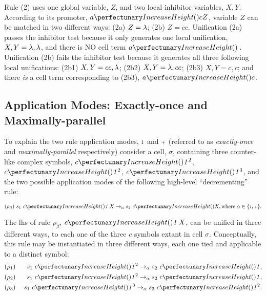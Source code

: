 Rule (2) uses one global variable, \(Z\), and two local inhibitor variables, \(X, Y\).
According to its promoter, \(\cpfunc{a}{cZ}\), variable \(Z\) can be matched in two different ways: 
(2a) \(Z = \lambda\); (2b) \(Z = cc\).
Unification (2a) passes the inhibitor test because it only generates one local unification,
\(X, Y = \lambda, \lambda\), and there is NO cell term \(\cpfunc{a}{\,}\).
Unification (2b) fails the inhibitor test because it generates all three following local unifications:
(2b1) \(X, Y = cc, \lambda\); (2b2) \(X, Y = \lambda, cc\); (2b3) \(X, Y = c, c\); 
and there \emph{is} a cell term corresponding to (2b3), \(\cpfunc{a}{c}\).

\subsection{\label{sec:cps:applicationmodes}Application Modes: Exactly-once and Maximally-parallel}
To explain the two rule application modes, \({\scriptstyle 1}\) and \({\scriptstyle +}\) (referred to as \emph{exactly-once} and \emph{maximally-parallel} respectively) consider a cell, \(\sigma\), containing three counter-like complex symbols,
\(\cpfunc{c}{\cpundig^2}\), \(\cpfunc{c}{\cpundig^2}\), \(\cpfunc{c}{\cpundig^3}\),
and the two possible application modes of the following high-level ``decrementing'' rule:
\vspace{-0.2cm}
\begin{framed}
\vspace{-0.5cm}
\[(\rho_\beta) ~s_1 ~\cpfunc{c}{\cpundig \, X} \rightarrow_{\alpha} s_2 ~\cpfunc{c}{X},\\
\mathrm{where} \; \alpha \in \{\cponce, \cpmaxpar\}.\]
\vspace{-0.8cm}
\end{framed}

The \gls{lhs} of rule \(\rho_\beta\), \(\cpfunc{c}{\cpundig \, X}\), can be unified in three different ways,
to each one of the three \(c\) symbols extant in cell \(\sigma\).
Conceptually, this rule may be instantiated in three different ways,
each one tied and applicable to a distinct symbol:
\begin{eqnarray*}
& (\rho_1)  & ~s_1 ~\cpfunc{c}{\cpundig^2} \rightarrow_{\alpha} s_2 ~\cpfunc{c}{\cpundig},\\
& (\rho_2)  & ~s_1 ~\cpfunc{c}{\cpundig^2} \rightarrow_{\alpha} s_2 ~\cpfunc{c}{\cpundig},\\
& (\rho_3) & ~s_1 ~\cpfunc{c}{\cpundig^3} \rightarrow_{\alpha} s_2 ~\cpfunc{c}{\cpundig^2}.
\end{eqnarray*}

